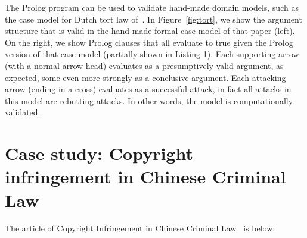 \documentclass{IOS-Book-Article}
\begin{document}
The Prolog program can be used to validate hand-made domain models, such as the case model for Dutch tort law of~\cite{Verheij2017Formalizing}. In Figure~\ref{fig:tort}, we show the argument structure that is valid in the hand-made formal case model of that paper (left). On the right, we show Prolog clauses that all evaluate to true given the Prolog version of that case model (partially shown in Listing 1). Each supporting arrow (with a normal arrow head) evaluates as a presumptively valid argument, as expected, some even more strongly as a conclusive argument. Each attacking arrow (ending in a cross) evaluates as a successful attack, in fact all attacks in this model are rebutting attacks. In other words, the model is computationally validated.

\begin{figure*}[btp]
	\scalebox{0.7}{}
\caption{The Dutch tort law model: argument structure (left); in Prolog (right)}
\label{fig:tort}
\end{figure*}


\section{Case study: Copyright infringement in Chinese Criminal Law}




\noindent The article of Copyright Infringement in Chinese Criminal Law~\cite{NPC1997CCL} is below:
\newline
\end{document}
